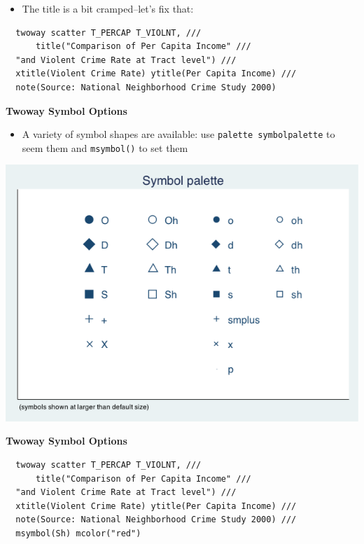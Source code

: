 \documentclass[]{book}
\providecommand{\tightlist}{%
  \setlength{\itemsep}{0pt}\setlength{\parskip}{0pt}}
\begin{document}
\begin{itemize}
\tightlist
\item
  The title is a bit cramped--let's fix that:
\end{itemize}

\begin{verbatim}
  twoway scatter T_PERCAP T_VIOLNT, ///
      title("Comparison of Per Capita Income" ///
  "and Violent Crime Rate at Tract level") ///
  xtitle(Violent Crime Rate) ytitle(Per Capita Income) ///
  note(Source: National Neighborhood Crime Study 2000) 
\end{verbatim}

\textbf{Twoway Symbol Options}

\begin{itemize}
\tightlist
\item
  A variety of symbol shapes are available: use \texttt{palette\ symbolpalette} to seem them and \texttt{msymbol()} to set them
\end{itemize}

\includegraphics{Stata/StataModGraph/images/Symbol.png}

\textbf{Twoway Symbol Options}

\begin{verbatim}
  twoway scatter T_PERCAP T_VIOLNT, ///
      title("Comparison of Per Capita Income" ///
  "and Violent Crime Rate at Tract level") ///
  xtitle(Violent Crime Rate) ytitle(Per Capita Income) ///
  note(Source: National Neighborhood Crime Study 2000) ///
  msymbol(Sh) mcolor("red")
\end{verbatim}
\end{document}
